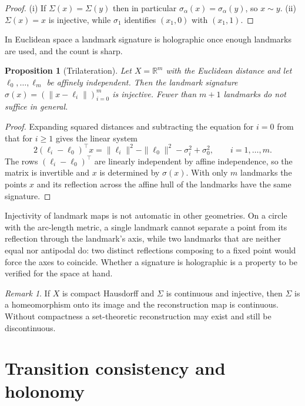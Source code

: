 \documentclass[11pt]{article}
\newtheorem{proposition}{Proposition}
\theoremstyle{remark}
\newtheorem{remark}{Remark}
\newcommand{\R}{\mathbb{R}}
\begin{document}
\begin{proof}
(i) If $\Sigma(x)=\Sigma(y)$ then in particular $\sigma_\alpha(x)=\sigma_\alpha(y)$, so $x\sim y$. (ii) $\Sigma(x)=x$ is injective, while $\sigma_1$ identifies $(x_1,0)$ with $(x_1,1)$.
\end{proof}

In Euclidean space a landmark signature is holographic once enough landmarks are used, and the count is sharp.

\begin{proposition}[Trilateration]
Let $X=\R^m$ with the Euclidean distance and let $\ell_0,\dots,\ell_m$ be affinely independent. Then the landmark signature $\sigma(x)=(\|x-\ell_i\|)_{i=0}^m$ is injective. Fewer than $m+1$ landmarks do not suffice in general.
\end{proposition}

\begin{proof}
Expanding squared distances and subtracting the equation for $i=0$ from that for $i\ge1$ gives the linear system
\[
2(\ell_i-\ell_0)^{\top}x=\|\ell_i\|^2-\|\ell_0\|^2-\sigma_i^2+\sigma_0^2,\qquad i=1,\dots,m.
\]
The rows $(\ell_i-\ell_0)^{\top}$ are linearly independent by affine independence, so the matrix is invertible and $x$ is determined by $\sigma(x)$. With only $m$ landmarks the points $x$ and its reflection across the affine hull of the landmarks have the same signature.
\end{proof}

Injectivity of landmark maps is not automatic in other geometries. On a circle with the arc-length metric, a single landmark cannot separate a point from its reflection through the landmark's axis, while two landmarks that are neither equal nor antipodal do: two distinct reflections composing to a fixed point would force the axes to coincide. Whether a signature is holographic is a property to be verified for the space at hand.

\begin{remark}
If $X$ is compact Hausdorff and $\Sigma$ is continuous and injective, then $\Sigma$ is a homeomorphism onto its image and the reconstruction map is continuous. Without compactness a set-theoretic reconstruction may exist and still be discontinuous.
\end{remark}

\section{Transition consistency and holonomy}
\end{document}
